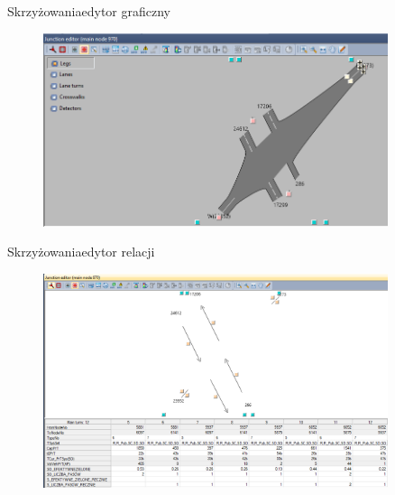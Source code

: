 \documentclass[8pt]{beamer}
\begin{document}
\begin{frame}{Skrzyżowania}{edytor graficzny}
\begin{figure}\begin{center}
\includegraphics[width=0.9\textwidth]{geom_editor}
 \end{center}  \end{figure} 
\end{frame}

\begin{frame}{Skrzyżowania}{edytor relacji}
\begin{figure}\begin{center}
\includegraphics[width=0.9\textwidth]{junction_editor}
 \end{center}  \end{figure} 
\end{frame}
\end{document}
